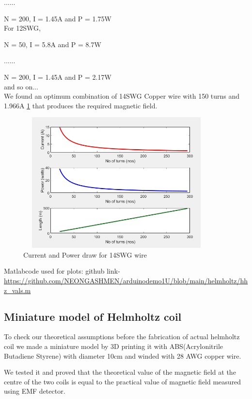 \noindent ......

\noindent N = 200, I = 1.45A and P = 1.75W\\

\noindent For 12SWG,

\noindent N = 50, I = 5.8A and P = 8.7W

\noindent ......

\noindent N = 200, I = 1.45A and P = 2.17W\\

\noindent and so on...\\

We found an optimum combination of 14SWG Copper wire with 150 turns and 1.966A \ref{fig-helm-vals} that produces the required magnetic field.\\

\begin{figure}[h!]
	\centering
	\includegraphics[width=4in,height=2.8in]{images/14swg.png}
	\caption{Current and Power draw for 14SWG wire}
	\label{fig-helm-vals}
\end{figure}

\par Matlabcode used for plots:
github link- \url{https://github.com/NEONGASHMEN/arduinodemo1U/blob/main/helmholtz/hhz_vals.m}

\subsection{Miniature model of Helmholtz coil}
To check our theoretical assumptions before the fabrication of actual helmholtz coil we made a miniature model by 3D printing it with ABS(Acrylonitrile Butadiene Styrene) with diameter 10cm and winded with 28 AWG copper wire.

\par We tested it and proved that the theoretical value of the magnetic field at the centre of the two coils is equal to the practical value of magnetic field measured using EMF detector.


